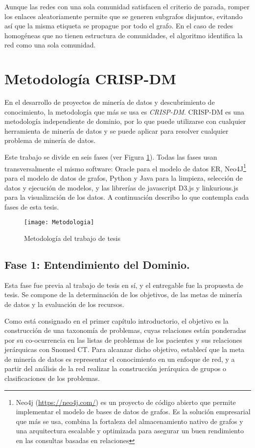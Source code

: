 Aunque las redes con una sola comunidad satisfacen el criterio de parada, romper los enlaces aleatoriamente permite que se generen subgrafos disjuntos, evitando así que la misma etiqueta se propague por todo el grafo. En el caso de redes homogéneas que no tienen estructura de comunidades, el algoritmo identifica la red como una sola comunidad.


\section{Metodología CRISP-DM}
En el desarrollo de proyectos de minería de datos y descubrimiento de conocimiento, la metodología que más se usa es \textit{\acrshort{CRISP-DM}}. \acrshort{CRISP-DM} es una metodología independiente de dominio, por lo que puede utilizarse con cualquier herramienta de minería de datos y se puede aplicar para resolver cualquier problema de minería de datos.\cite{Marbn2009AModel}

Este trabajo se divide en seis fases (ver Figura \ref{fig:Metodologia}). Todas las fases usan transversalmente el mismo software: Oracle para el modelo de datos ER, Neo4J\footnote{Neo4j (\url{https://neo4j.com/}) es un proyecto de código abierto que permite implementar el modelo de bases de datos de grafos. Es la solución empresarial que más se usa, combina la fortaleza del almacenamiento nativo de grafos y una arquitectura escalable y optimizada para asegurar un buen rendimiento en las consultas basadas en relaciones} para el modelo de datos de grafos, Python y Java para la limpieza, selección de datos y ejecución de modelos, y las librerías de javascript D3.js y linkurious.js para la visualización de los datos. 
A continuación describo lo que contempla cada fases de esta tesis.

\begin{figure}[ht]
\caption{Metodología del trabajo de tesis}
\label{fig:Metodologia}
\centering
\texttt{[image: Metodologia]}
\end{figure}

\subsection{Fase 1: Entendimiento del Dominio.} Esta fase fue previa al trabajo de tesis en sí, y el entregable fue la propuesta de tesis. Se compone de la determinación de los objetivos, de las metas de minería de datos y la evaluación de los recursos.

Como está consignado en el primer capítulo introductorio, el objetivo es la construcción de una taxonomía de problemas, cuyas relaciones están ponderadas por su co-ocurrencia en las listas de problemas de los pacientes y sus relaciones jerárquicas con Snomed CT. Para alcanzar dicho objetivo, establecí que la meta de minería de datos es representar el conocimiento en un enfoque de red, y a partir del análisis de la red realizar la construcción jerárquica de grupos o clasificaciones de los problemas.

